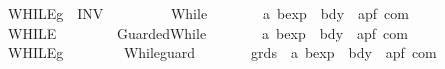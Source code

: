 \begin{isabellebody}
\ \ \ \ \ \ \ \ {\isacharparenleft}{\isachardoublequoteopen}{\isacharparenleft}{}WHILE\isactrlsub g\ {\isacharparenleft}{\isacharunderscore}{\isacharparenright}{\isacharslash}\ INV\ {\isacharparenleft}{\isacharunderscore}{\isacharparenright}\ {\isacharslash}{\isacharunderscore}{\isacharparenright}{\isachardoublequoteclose}\ \ {\isacharbrackleft}{}{}{\isacharcomma}\ {}{\isacharcomma}\ {}{}{\isacharbrackright}\ {}{}{\isacharparenright}\isanewline
\ \ {\isachardoublequoteopen}{\isacharunderscore}While{\isachardoublequoteclose}\ \ \ \ \ \ \ {\isacharcolon}{\isacharcolon}\ {\isachardoublequoteopen}{\isacharprime}a\ bexp\ {\isacharequal}{\isachargreater}\ bdy\ {\isacharequal}{\isachargreater}\ {\isacharparenleft}{\isacharprime}a{\isacharcomma}{\isacharprime}p{\isacharcomma}{\isacharprime}f{\isacharparenright}\ com{\isachardoublequoteclose}\isanewline
\ \ \ \ \ \ \ \ {\isacharparenleft}{\isachardoublequoteopen}{\isacharparenleft}{}WHILE\ {\isacharparenleft}{\isacharunderscore}{\isacharparenright}\ {\isacharslash}{\isacharunderscore}{\isacharparenright}{\isachardoublequoteclose}\ \ {\isacharbrackleft}{}{}{\isacharcomma}\ {}{}{\isacharbrackright}\ {}{}{\isacharparenright}\isanewline
\ \ {\isachardoublequoteopen}{\isacharunderscore}GuardedWhile{\isachardoublequoteclose}\ \ \ \ \ \ \ {\isacharcolon}{\isacharcolon}\ {\isachardoublequoteopen}{\isacharprime}a\ bexp\ {\isacharequal}{\isachargreater}\ bdy\ {\isacharequal}{\isachargreater}\ {\isacharparenleft}{\isacharprime}a{\isacharcomma}{\isacharprime}p{\isacharcomma}{\isacharprime}f{\isacharparenright}\ com{\isachardoublequoteclose}\isanewline
\ \ \ \ \ \ \ \ {\isacharparenleft}{\isachardoublequoteopen}{\isacharparenleft}{}WHILE\isactrlsub g\ {\isacharparenleft}{\isacharunderscore}{\isacharparenright}\ {\isacharslash}{\isacharunderscore}{\isacharparenright}{\isachardoublequoteclose}\ \ {\isacharbrackleft}{}{}{\isacharcomma}\ {}{}{\isacharbrackright}\ {}{}{\isacharparenright}\isanewline
\ \ {\isachardoublequoteopen}{\isacharunderscore}While{\isacharunderscore}guard{\isachardoublequoteclose}\ \ \ \ \ \ \ {\isacharcolon}{\isacharcolon}\ {\isachardoublequoteopen}grds\ {\isacharequal}{\isachargreater}\ {\isacharprime}a\ bexp\ {\isacharequal}{\isachargreater}\ bdy\ {\isacharequal}{\isachargreater}\ {\isacharparenleft}{\isacharprime}a{\isacharcomma}{\isacharprime}p{\isacharcomma}{\isacharprime}f{\isacharparenright}\ com{\isachardoublequoteclose}\isanewline

\end{isabellebody}
